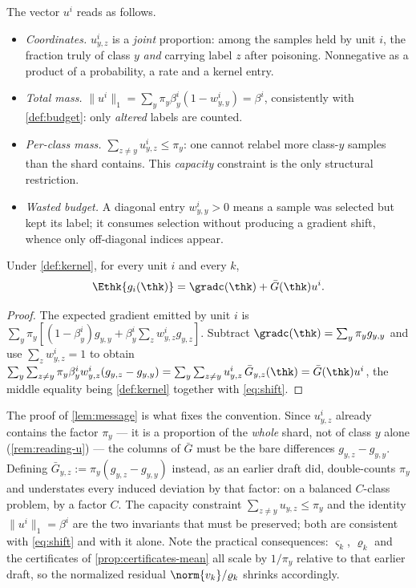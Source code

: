 \begin{remark}[Reading $u^i$]
\label{rem:reading-u}
The vector $u^i$ reads as follows.
\begin{itemize}
\item \emph{Coordinates.} $u^i_{y,z}$ is a \emph{joint} proportion: among the samples held by unit $i$, the fraction truly of class $y$ \emph{and} carrying label $z$ after poisoning. Nonnegative as a product of a probability, a rate and a kernel entry.
\item \emph{Total mass.} $\|u^i\|_1=\sum_y\pi_y\beta^i_y(1-w^i_{y,y})=\beta^i$, consistently with \cref{def:budget}: only \emph{altered} labels are counted.
\item \emph{Per-class mass.} $\sum_{z\neq y}u^i_{y,z}\le\pi_y$: one cannot relabel more class-$y$ samples than the shard contains. This \emph{capacity} constraint is the only structural restriction.
\item \emph{Wasted budget.} A diagonal entry $w^i_{y,y}>0$ means a sample was selected but kept its label; it consumes selection without producing a gradient shift, whence only off-diagonal indices appear.
\end{itemize}
\end{remark}

\begin{lemma}
\label{lem:message}
Under \cref{def:kernel}, for every unit $i$ and every $k$,
\[
\Ethk{g_i(\thk)}=\gradc(\thk)+\bar G(\thk)u^i.
\]
\end{lemma}
\begin{proof}
The expected gradient emitted by unit $i$ is
$\sum_y\pi_y[(1-\beta^i_y)g_{y,y}+\beta^i_y\sum_zw^i_{y,z}g_{y,z}]$. Subtract
$\gradc(\thk)=\sum_y\pi_yg_{y,y}$ and use $\sum_zw^i_{y,z}=1$ to obtain
$\sum_y\sum_{z\neq y}\pi_y\beta^i_yw^i_{y,z}(g_{y,z}-g_{y,y})
=\sum_y\sum_{z\neq y}u^i_{y,z}\,\bar G_{y,z}(\thk)=\bar G(\thk)u^i$,
the middle equality being \cref{def:kernel} together with \cref{eq:shift}.
\end{proof}

\begin{remark}
\label{rem:no-pi}
The proof of \cref{lem:message} is what fixes the convention. Since $u^i_{y,z}$ already contains
the factor $\pi_y$ --- it is a proportion of the \emph{whole} shard, not of class $y$ alone
(\cref{rem:reading-u}) --- the columns of $\bar G$ must be the bare differences
$g_{y,z}-g_{y,y}$. Defining $\bar G_{y,z}:=\pi_y(g_{y,z}-g_{y,y})$ instead, as an earlier draft
did, double-counts $\pi_y$ and understates every induced deviation by that factor: on a balanced
$C$-class problem, by a factor $C$. The capacity constraint $\sum_{z\neq y}u_{y,z}\le\pi_y$ and
the identity $\|u^i\|_1=\beta^i$ are the two invariants that must be preserved; both are
consistent with \cref{eq:shift} and with it alone. Note the practical consequences: $\varsigma_k$,
$\varrho_k$ and the certificates of \cref{prop:certificates-mean} all scale by $1/\pi_y$ relative
to that earlier draft, so the normalized residual $\norm{v_k}/\varrho_k$ shrinks accordingly.
\end{remark}

